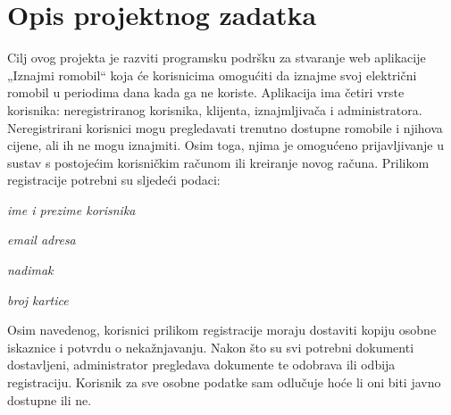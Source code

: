 \chapter{Opis projektnog zadatka}
		
		Cilj ovog projekta je razviti programsku podršku za stvaranje web aplikacije „Iznajmi romobil“ koja će korisnicima omogućiti da iznajme svoj električni romobil u periodima dana kada ga ne koriste. Aplikacija ima četiri vrste
		korisnika: neregistriranog korisnika, klijenta, iznajmljivača i administratora. 
		Neregistrirani korisnici mogu pregledavati trenutno dostupne romobile i njihova cijene, ali ih ne mogu iznajmiti.  Osim toga, njima je omogućeno prijavljivanje u sustav s postojećim korisničkim računom ili kreiranje novog računa. Prilikom registracije potrebni su sljedeći podaci:
		
		\begin{packed_item}
			\item \textit{ime i prezime korisnika}
			\item \textit{email adresa}
			\item \textit{nadimak}
			\item \textit{broj kartice}
		\end{packed_item}
		
		Osim navedenog, korisnici prilikom registracije moraju dostaviti kopiju osobne iskaznice i potvrdu o nekažnjavanju. Nakon što su svi potrebni dokumenti dostavljeni, administrator pregledava dokumente te odobrava ili odbija registraciju. Korisnik za sve osobne podatke sam odlučuje hoće li oni biti javno dostupne ili ne. 
		
		
		
		
		
		
	